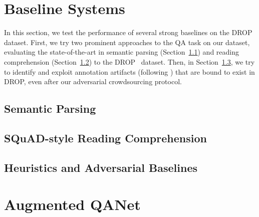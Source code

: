 \documentclass[11pt,a4paper]{article}
\newcommand{\secref}[1]{Section~\ref{sec:#1}}
\newcommand{\drop}[0]{DROP}
\begin{document}
\section{Baseline Systems}
\label{sec:baselines}

In this section, we test the performance of several strong baselines on the
\drop~ dataset.
First, we try two prominent approaches to the QA task on our dataset, evaluating
the state-of-the-art in semantic parsing (\secref{semparse}) and reading comprehension (\secref{rc}) to the \drop~ dataset.
Then, in \secref{heuristics},
we try to identify and exploit annotation artifacts (following \cite{Gururangan:2018,Kaushik2018HowMR})
that are bound to exist in \drop, even after our adversarial crowdsourcing protocol.

\subsection{Semantic Parsing}
\label{sec:semparse}


\subsection{SQuAD-style Reading Comprehension}
\label{sec:rc}


\subsection{Heuristics and Adversarial Baselines}
\label{sec:heuristics}



\section{Augmented QANet}
\label{sec:model}

\end{document}
